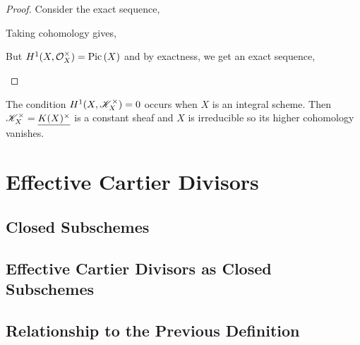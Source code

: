 \documentclass[12pt]{article}
\begin{document}
\begin{proof}
Consider the exact sequence,
\begin{center}
\end{center}
Taking cohomology gives,
\begin{center}
\end{center}
But $H^1(X, \mathcal{O}_{X}^\times) = \mathrm{Pic} \left( X \right)$ and by exactness, we get an exact sequence,
\begin{center}
\end{center}
\end{proof}

\begin{rmk}
The condition $H^1(X, \mathscr{K}_X^\times) = 0$ occurs when $X$ is an integral scheme. Then $\mathscr{K}_X^\times = \underline{K(X)^\times}$ is a constant sheaf and $X$ is irreducible so its higher cohomology vanishes. 
\end{rmk}

\section{Effective Cartier Divisors}

\subsection{Closed Subschemes}

\subsection{Effective Cartier Divisors as Closed Subschemes}

\subsection{Relationship to the Previous Definition}
\end{document}
